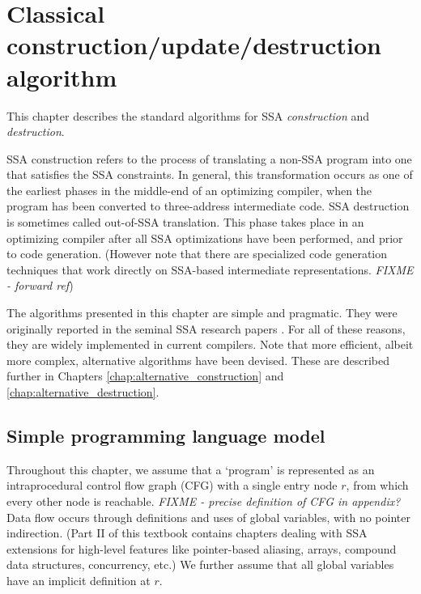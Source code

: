 \chapter{Classical construction/update/destruction algorithm }
\label{chap:classical_construction}

{
\def\phiops{$\phi$-functions}
\def\phiop{$\phi$-function}


This chapter describes the standard algorithms for SSA \textit{construction} and
\textit{destruction}.

SSA construction refers to the process of translating a non-SSA program into
one that satisfies the SSA constraints. In general, this transformation
occurs as one of the
earliest phases in the middle-end of an optimizing compiler, when the program
has been converted to three-address intermediate code.
SSA destruction is sometimes called out-of-SSA translation. This phase
takes place in an optimizing compiler after all SSA optimizations have
been performed, and prior to code generation. (However note that there are
specialized code generation techniques that work directly on SSA-based
intermediate representations. \emph{FIXME - forward ref})

The algorithms presented in this chapter are simple and pragmatic.
They were originally reported in the seminal SSA research
papers \cite{cytron89efficiently,cytron91efficiently}.
For all of these reasons, they are
widely implemented in current compilers.
Note that more
efficient, albeit more complex, alternative algorithms have been devised.
These are described further in Chapters \ref{chap:alternative_construction}
and \ref{chap:alternative_destruction}.

\section{Simple programming language model}

Throughout this chapter,
we assume that a `program' is represented as an
intraprocedural control flow graph (CFG)
with a single entry node $r$, from which every other
node is reachable.
\emph{FIXME - precise definition of CFG in appendix?}
Data flow occurs through definitions and uses of 
global variables, with no pointer indirection.
(Part II of this textbook contains chapters dealing with
SSA extensions for high-level features like
pointer-based aliasing, arrays, compound data structures, concurrency, etc.)
We further assume that
all global variables have an implicit definition at $r$.



}
